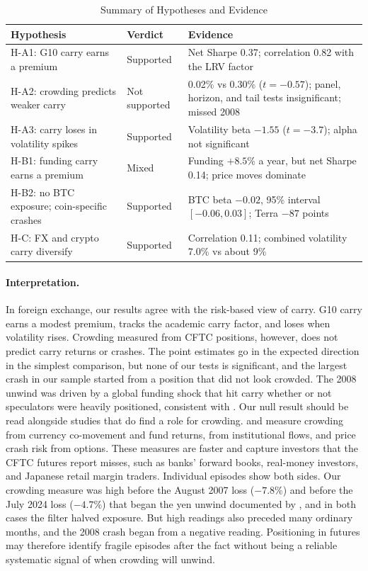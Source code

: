\documentclass[11pt]{article}
\begin{document}
\begin{table}[!htbp]
\centering
\caption{Summary of Hypotheses and Evidence}\label{tab:verdict}
\small
\begin{tabular}{p{5.2cm}p{2.2cm}p{7.2cm}}
\toprule
Hypothesis & Verdict & Evidence \\
\midrule
H-A1: G10 carry earns a premium & Supported & Net Sharpe 0.37; correlation 0.82 with the LRV factor \\
H-A2: crowding predicts weaker carry & Not supported & 0.02\% vs 0.30\% ($t=-0.57$); panel, horizon, and tail tests insignificant; missed 2008 \\
H-A3: carry loses in volatility spikes & Supported & Volatility beta $-1.55$ ($t=-3.7$); alpha not significant \\
H-B1: funding carry earns a premium & Mixed & Funding $+8.5$\% a year, but net Sharpe 0.14; price moves dominate \\
H-B2: no BTC exposure; coin-specific crashes & Supported & BTC beta $-0.02$, 95\% interval $[-0.06, 0.03]$; Terra $-87$ points \\
H-C: FX and crypto carry diversify & Supported & Correlation 0.11; combined volatility 7.0\% vs about 9\% \\
\bottomrule
\end{tabular}
\end{table}

\paragraph{Interpretation.}
In foreign exchange, our results agree with the risk-based view of carry. G10 carry earns a modest premium, tracks the academic carry factor, and loses when volatility rises. Crowding measured from CFTC positions, however, does not predict carry returns or crashes. The point estimates go in the expected direction in the simplest comparison, but none of our tests is significant, and the largest crash in our sample started from a position that did not look crowded. The 2008 unwind was driven by a global funding shock that hit carry whether or not speculators were heavily positioned, consistent with \citet{BrunnermeierPedersen2009}. Our null result should be read alongside studies that do find a role for crowding. \citet{Sokolovski2016} and \citet{PojarlievLevich2011} measure crowding from currency co-movement and fund returns, \citet{CheemaFox2025} from institutional flows, and \citet{Kutuk2025} price crash risk from options. These measures are faster and capture investors that the CFTC futures report misses, such as banks' forward books, real-money investors, and Japanese retail margin traders. Individual episodes show both sides. Our crowding measure was high before the August 2007 loss ($-7.8$\%) and before the July 2024 loss ($-4.7$\%) that began the yen unwind documented by \citet{Aquilina2024}, and in both cases the filter halved exposure. But high readings also preceded many ordinary months, and the 2008 crash began from a negative reading. Positioning in futures may therefore identify fragile episodes after the fact without being a reliable systematic signal of when crowding will unwind.
\end{document}
